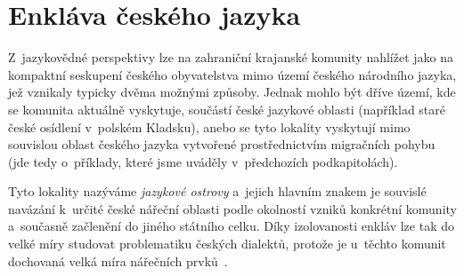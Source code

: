 \hypertarget{enkluxe1va-ux10deskuxe9ho-jazyka}{%
\section{Enkláva českého jazyka}\label{enkluxe1va-ux10deskuxe9ho-jazyka}}

Z~jazykovědné perspektivy lze na zahraniční krajanské komunity nahlížet jako na kompaktní seskupení českého obyvatelstva mimo území českého národního jazyka, jež vznikaly typicky dvěma možnými způsoby. Jednak mohlo být dříve území, kde se komunita aktuálně vyskytuje, součástí české jazykové oblasti (například staré české osídlení v~polském Kladsku), anebo se tyto lokality vyskytují mimo souvislou oblast českého jazyka vytvořené prostřednictvím migračních pohybu (jde tedy o~příklady, které jsme uváděly v~předchozích podkapitolách).

Tyto lokality nazýváme \emph{jazykové ostrovy} a~jejich hlavním znakem je souvislé navázání k~určité české nářeční oblasti podle okolností vzniků konkrétní komunity a~současně začlenění do jiného státního celku. Díky izolovanosti enkláv lze tak do velké míry studovat problematiku českých dialektů, protože je u~těchto komunit dochovaná velká míra nářečních prvků~\parencite{enklava2017}.
